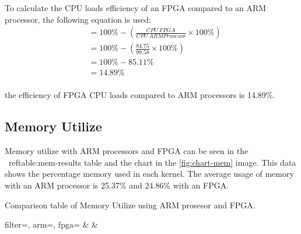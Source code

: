 To calculate the CPU loads efficiency of an FPGA compared to an ARM processor, the following equation is used:
\begin{equation*}
    \begin{split}
& = 100\% - \left( \frac{CPU\ FPGA}{CPU\ ARM Prosesor} \times 100\% \right) \\
& = 100\% - \left( \frac{84.75}{99.58} \times 100\% \right) \\
& = 100\% - 85.11\% \\
& = 14.89\% \\
    \end{split}
\end{equation*}

the efficiency of FPGA CPU loads compared to ARM processors is 14.89\%.


\subsection{Memory Utilize}


Memory utilize with ARM processors and FPGA can be seen in the \ ref{table:mem-results} table and the chart in the \ref{fig:chart-mem} image. This data shows the percentage memory used in each kernel. The average usage of memory with an ARM processor is 25.37\% and 24.86\% with an FPGA.

\begin{atable}
    \caption{Comparison table of Memory Utilize using ARM prosesor and FPGA.}
    \label{table:hasil-mem}
        {
            filter=\filter, 
            arm=\arm, 
            fpga=\fpga}
        {
            \filter & 
            \arm & 
            \fpga }
\end{atable}

